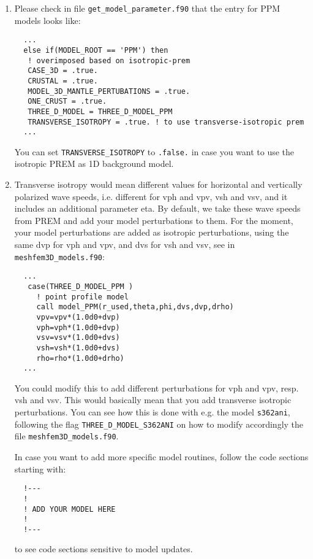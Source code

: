 \begin{description}
\begin{enumerate}
\item Please check in file \texttt{get\_model\_parameter.f90} that the entry for PPM models looks like:

{\footnotesize
\begin{verbatim}
  ...
  else if(MODEL_ROOT == 'PPM') then
   ! overimposed based on isotropic-prem
   CASE_3D = .true.
   CRUSTAL = .true.
   MODEL_3D_MANTLE_PERTUBATIONS = .true.
   ONE_CRUST = .true.
   THREE_D_MODEL = THREE_D_MODEL_PPM
   TRANSVERSE_ISOTROPY = .true. ! to use transverse-isotropic prem
  ...
\end{verbatim}
}

\noindent
You can set \texttt{TRANSVERSE\_ISOTROPY} to \texttt{.false.} in case you want to use the isotropic PREM
as 1D background model.

\item Transverse isotropy would mean different values for horizontal and vertically polarized wave speeds,
i.e. different for vph and   vpv, vsh and vsv, and it includes an additional parameter eta.
By default, we take these wave speeds from PREM and add your model perturbations to them.
For the moment, your model perturbations are added as isotropic perturbations, using the same dvp for vph and vpv,
and dvs for vsh   and vsv, see in \texttt{meshfem3D\_models.f90}:

{\footnotesize
\begin{verbatim}
  ...
   case(THREE_D_MODEL_PPM )
     ! point profile model
     call model_PPM(r_used,theta,phi,dvs,dvp,drho)
     vpv=vpv*(1.0d0+dvp)
     vph=vph*(1.0d0+dvp)
     vsv=vsv*(1.0d0+dvs)
     vsh=vsh*(1.0d0+dvs)
     rho=rho*(1.0d0+drho)
  ...
\end{verbatim}
}

\noindent
You could modify this to add different perturbations for vph and vpv, resp. vsh and vsv.
This would basically mean that you add transverse isotropic perturbations.
You can see how this is done with e.g. the model \texttt{s362ani},
following the flag \texttt{THREE\_D\_MODEL\_S362ANI} on how to modify accordingly the file \texttt{meshfem3D\_models.f90}.

In case you want to add more specific model routines, follow the code sections starting with:

{\footnotesize
\begin{verbatim}
  !---
  !
  ! ADD YOUR MODEL HERE
  !
  !---
\end{verbatim}
}

\noindent
to see code sections sensitive to model updates.

  \end{enumerate}

\end{description}



